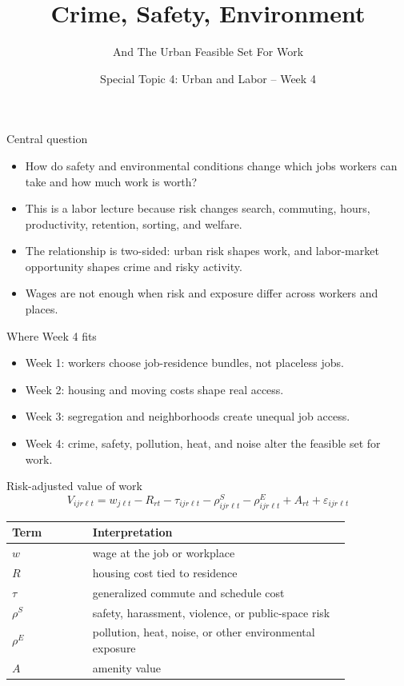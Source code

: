 \documentclass[aspectratio=169,11pt]{beamer}
\title{Crime, Safety, Environment}
\subtitle{And The Urban Feasible Set For Work}
\author{Special Topic 4: Urban and Labor -- Week 4}
\date{}
\begin{document}
\begin{frame}
  \titlepage
\end{frame}

\begin{frame}{Central question}
\begin{itemize}
    \item How do safety and environmental conditions change which jobs workers can take and how much work is worth?
    \item This is a labor lecture because risk changes search, commuting, hours, productivity, retention, sorting, and welfare.
    \item The relationship is two-sided: urban risk shapes work, and labor-market opportunity shapes crime and risky activity.
    \item Wages are not enough when risk and exposure differ across workers and places.
\end{itemize}
\end{frame}

\begin{frame}{Where Week 4 fits}
\begin{itemize}
    \item Week 1: workers choose job-residence bundles, not placeless jobs.
    \item Week 2: housing and moving costs shape real access.
    \item Week 3: segregation and neighborhoods create unequal job access.
    \item Week 4: crime, safety, pollution, heat, and noise alter the feasible set for work.
\end{itemize}
\end{frame}

\begin{frame}{Risk-adjusted value of work}
\[
V_{ijr\ell t}
=
w_{j\ell t}
- R_{rt}
- \tau_{ijr\ell t}
- \rho^S_{ijr\ell t}
- \rho^E_{ijr\ell t}
+ A_{rt}
+ \varepsilon_{ijr\ell t}
\]
\small
\begin{tabular}{p{0.20\linewidth} p{0.64\linewidth}}
\toprule
Term & Interpretation \\
\midrule
$w$ & wage at the job or workplace \\
$R$ & housing cost tied to residence \\
$\tau$ & generalized commute and schedule cost \\
$\rho^S$ & safety, harassment, violence, or public-space risk \\
$\rho^E$ & pollution, heat, noise, or other environmental exposure \\
$A$ & amenity value \\
\bottomrule
\end{tabular}
\end{frame}
\end{document}
